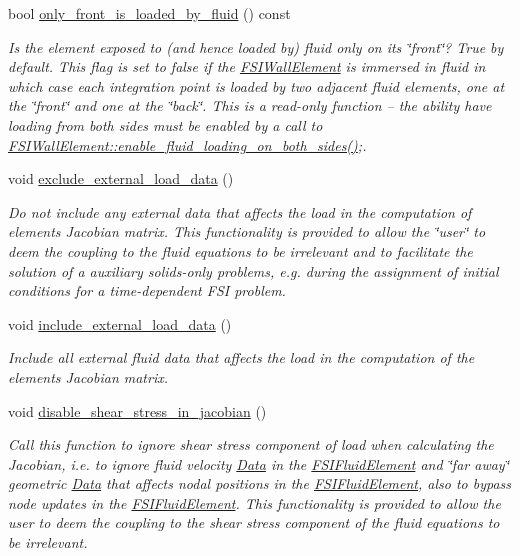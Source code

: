 \begin{DoxyCompactItemize}
bool \hyperlink{classoomph_1_1FSIWallElement_a5ba035695fb6a51b65280779ff65277b}{only\+\_\+front\+\_\+is\+\_\+loaded\+\_\+by\+\_\+fluid} () const
\begin{DoxyCompactList}\small\item\em Is the element exposed to (and hence loaded by) fluid only on its \char`\"{}front\char`\"{}? True by default. This flag is set to false if the \hyperlink{classoomph_1_1FSIWallElement}{F\+S\+I\+Wall\+Element} is immersed in fluid in which case each integration point is loaded by two adjacent fluid elements, one at the \char`\"{}front\char`\"{} and one at the \char`\"{}back\char`\"{}. This is a read-\/only function -- the ability have loading from both sides must be enabled by a call to \hyperlink{classoomph_1_1FSIWallElement_a0dc3efdeb5d0abf0ba473c0145652358}{F\+S\+I\+Wall\+Element\+::enable\+\_\+fluid\+\_\+loading\+\_\+on\+\_\+both\+\_\+sides()};. \end{DoxyCompactList}\item 
void \hyperlink{classoomph_1_1FSIWallElement_a872cb60fecdd19234a37be9f98546365}{exclude\+\_\+external\+\_\+load\+\_\+data} ()
\begin{DoxyCompactList}\small\item\em Do not include any external data that affects the load in the computation of element\textquotesingle{}s Jacobian matrix. This functionality is provided to allow the \char`\"{}user\char`\"{} to deem the coupling to the fluid equations to be irrelevant and to facilitate the solution of a auxiliary solids-\/only problems, e.\+g. during the assignment of initial conditions for a time-\/dependent F\+SI problem. \end{DoxyCompactList}\item 
void \hyperlink{classoomph_1_1FSIWallElement_a5e976f5a5d1d9f95b349ff532070bd78}{include\+\_\+external\+\_\+load\+\_\+data} ()
\begin{DoxyCompactList}\small\item\em Include all external fluid data that affects the load in the computation of the element\textquotesingle{}s Jacobian matrix. \end{DoxyCompactList}\item 
void \hyperlink{classoomph_1_1FSIWallElement_a5ccc42f1898bba6c5d04ec284db9fd17}{disable\+\_\+shear\+\_\+stress\+\_\+in\+\_\+jacobian} ()
\begin{DoxyCompactList}\small\item\em Call this function to ignore shear stress component of load when calculating the Jacobian, i.\+e. to ignore fluid velocity \hyperlink{classoomph_1_1Data}{Data} in the \hyperlink{classoomph_1_1FSIFluidElement}{F\+S\+I\+Fluid\+Element} and \char`\"{}far away\char`\"{} geometric \hyperlink{classoomph_1_1Data}{Data} that affects nodal positions in the \hyperlink{classoomph_1_1FSIFluidElement}{F\+S\+I\+Fluid\+Element}, also to bypass node updates in the \hyperlink{classoomph_1_1FSIFluidElement}{F\+S\+I\+Fluid\+Element}. This functionality is provided to allow the user to deem the coupling to the shear stress component of the fluid equations to be irrelevant. \end{DoxyCompactList}\item 

\end{DoxyCompactItemize}
